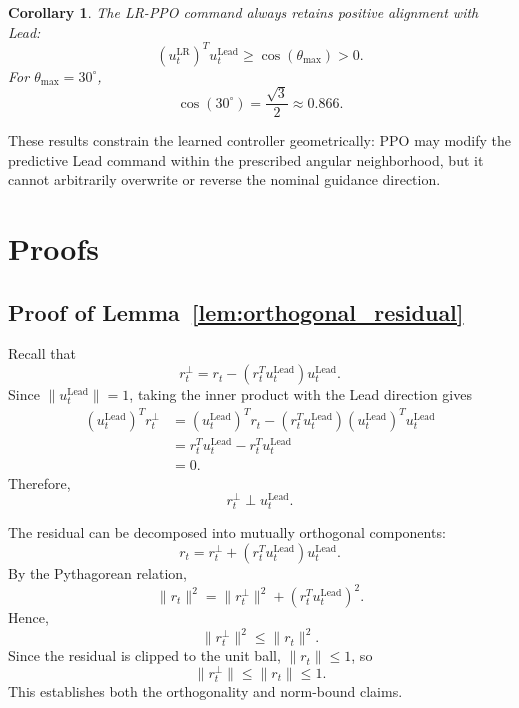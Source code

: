 \documentclass[10pt]{article}
\newtheorem{corollary}{Corollary}
\begin{document}
\begin{corollary}
\label{cor:positive_alignment}
The LR-PPO command always retains positive alignment with Lead:
\[
\left(u_t^{\mathrm{LR}}\right)^T
u_t^{\mathrm{Lead}}
\geq
\cos(\theta_{\max})
>
0.
\]
For \(\theta_{\max}=30^\circ\),
\[
\cos(30^\circ)
=
\frac{\sqrt{3}}{2}
\approx0.866.
\]
\end{corollary}

These results constrain the learned controller geometrically: PPO may modify
the predictive Lead command within the prescribed angular neighborhood, but
it cannot arbitrarily overwrite or reverse the nominal guidance direction.


\section*{Proofs}

\subsection*{Proof of Lemma~\ref{lem:orthogonal_residual}}

Recall that
\begin{equation}
r_t^\perp
=
r_t-
\left(r_t^T u_t^{\mathrm{Lead}}\right)
u_t^{\mathrm{Lead}}.
\label{eq:app_residual_projection}
\end{equation}
Since
\(
\|u_t^{\mathrm{Lead}}\|=1
\),
taking the inner product with the Lead direction gives
\begin{align}
\left(u_t^{\mathrm{Lead}}\right)^T r_t^\perp
&=
\left(u_t^{\mathrm{Lead}}\right)^T r_t
-
\left(r_t^T u_t^{\mathrm{Lead}}\right)
\left(u_t^{\mathrm{Lead}}\right)^T
u_t^{\mathrm{Lead}} \\
&=
r_t^T u_t^{\mathrm{Lead}}
-
r_t^T u_t^{\mathrm{Lead}} \\
&=0.
\end{align}
Therefore,
\begin{equation}
r_t^\perp
\perp
u_t^{\mathrm{Lead}}.
\label{eq:app_orthogonality}
\end{equation}

The residual can be decomposed into mutually orthogonal components:
\begin{equation}
r_t
=
r_t^\perp
+
\left(r_t^T u_t^{\mathrm{Lead}}\right)
u_t^{\mathrm{Lead}}.
\end{equation}
By the Pythagorean relation,
\begin{equation}
\|r_t\|^2
=
\|r_t^\perp\|^2
+
\left(r_t^T u_t^{\mathrm{Lead}}\right)^2.
\end{equation}
Hence,
\begin{equation}
\|r_t^\perp\|^2
\leq
\|r_t\|^2.
\end{equation}
Since the residual is clipped to the unit ball,
\(
\|r_t\|\leq1
\),
so
\begin{equation}
\|r_t^\perp\|
\leq
\|r_t\|
\leq1.
\end{equation}
This establishes both the orthogonality and norm-bound claims.
\end{document}
